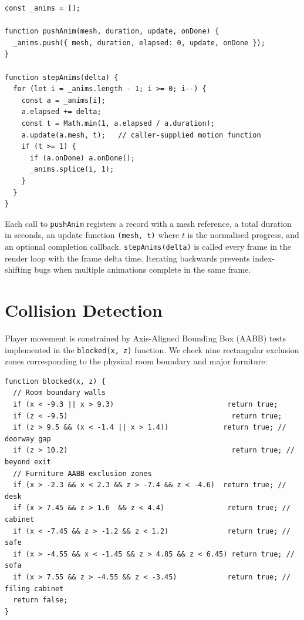 \documentclass[12pt, a4paper]{report}
\begin{document}
\begin{lstlisting}[style=jsStyle,
  caption={Animation system (\texttt{static/game.js}).},
  label=lst:anim]
const _anims = [];

function pushAnim(mesh, duration, update, onDone) {
  _anims.push({ mesh, duration, elapsed: 0, update, onDone });
}

function stepAnims(delta) {
  for (let i = _anims.length - 1; i >= 0; i--) {
    const a = _anims[i];
    a.elapsed += delta;
    const t = Math.min(1, a.elapsed / a.duration);
    a.update(a.mesh, t);   // caller-supplied motion function
    if (t >= 1) {
      if (a.onDone) a.onDone();
      _anims.splice(i, 1);
    }
  }
}
\end{lstlisting}

Each call to \texttt{pushAnim} registers a record with a mesh reference, a
total duration in seconds, an update function \texttt{(mesh, t)} where $t$ is
the normalised progress, and an optional completion callback.
\texttt{stepAnims(delta)} is called every frame in the render loop with the
frame delta time.  Iterating backwards prevents index-shifting bugs when
multiple animations complete in the same frame.

\section{Collision Detection}
\label{sec:collision}

Player movement is constrained by Axis-Aligned Bounding Box (AABB) tests
implemented in the \texttt{blocked(x, z)} function.  We check nine rectangular
exclusion zones corresponding to the physical room boundary and major furniture:

\begin{lstlisting}[style=jsStyle,
  caption={AABB collision detection (\texttt{static/game.js}).},
  label=lst:collision]
function blocked(x, z) {
  // Room boundary walls
  if (x < -9.3 || x > 9.3)                           return true;
  if (z < -9.5)                                       return true;
  if (z > 9.5 && (x < -1.4 || x > 1.4))             return true; // doorway gap
  if (z > 10.2)                                       return true; // beyond exit
  // Furniture AABB exclusion zones
  if (x > -2.3 && x < 2.3 && z > -7.4 && z < -4.6)  return true; // desk
  if (x > 7.45 && z > 1.6  && z < 4.4)               return true; // cabinet
  if (x < -7.45 && z > -1.2 && z < 1.2)              return true; // safe
  if (x > -4.55 && x < -1.45 && z > 4.85 && z < 6.45) return true; // sofa
  if (x > 7.55 && z > -4.55 && z < -3.45)            return true; // filing cabinet
  return false;
}
\end{lstlisting}
\end{document}
